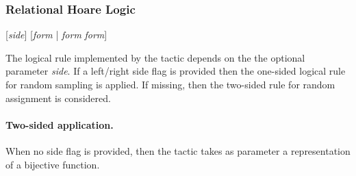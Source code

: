 

\subsubsection{Relational Hoare Logic}

\Syntax {}[\textit{side}] [\textit{form} | \textit{form} \textit{form}]

\Description

The logical rule implemented by the  tactic depends on the
the optional parameter \textit{side}. If a left/right side flag is
provided then the one-sided logical rule for random sampling is
applied. If missing, then the two-sided rule for random assignment is
considered.
%

\paragraph*{Two-sided application.} 
When no side flag is provided, then the  tactic takes as
parameter a representation of a bijective function.


